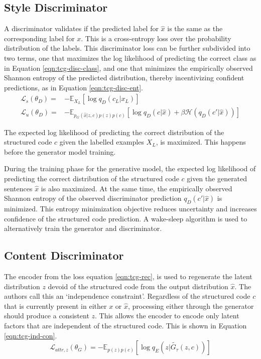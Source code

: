 \subsection{Style Discriminator}

A discriminator validates if the predicted label for $\hat{x}$ is the same as the corresponding label for $x$. This is a cross-entropy loss over the probability distribution of the labels. This discriminator loss can be further subdivided into two terms, one that maximizes the log likelihood of predicting the correct class as in Equation \ref{eqn:tcg-disc-class}, and one that minimizes the empirically observed Shannon entropy of the predicted distribution, thereby incentivizing confident predictions, as in Equation \ref{eqn:tcg-disc-ent}.
\begin{align}
	\label{eqn:tcg-disc-class}
	\mathcal{L}_s(\theta_D) = & - \mathbb{E}_{X_L}[\log q_D(c_L|x_L)]   \\
	\label{eqn:tcg-disc-ent}
	\mathcal{L}_u(\theta_D) = & - \mathbb{E}_{p_G(\hat{x}|z,c)p(z)p(c)}
	[\log q_D(c|\hat{x}) + \beta \mathcal{H}(q_D(c'|\hat{x}))]
\end{align}

The expected log likelihood of predicting the correct distribution of the structured code $c$ given the labelled examples $X_L$, is maximized. This happens before the generator model training.

During the training phase for the generative model, the expected log likelihood of predicting the correct distribution of the structured code $c$ given the generated sentences $\hat{x}$ is also maximized. At the same time, the empirically observed Shannon entropy of the observed discriminator prediction $q_D(c'|\hat{x})$ is minimized. This entropy minimization objective reduces uncertainty and increases confidence of the structured code prediction. A wake-sleep algorithm \citep{hinton1995wake} is used to alternatively train the generator and discriminator.

\subsection{Content Discriminator}

The encoder from the loss equation \ref{eqn:tcg-rec}, is used to regenerate the latent distribution $z$ devoid of the structured code from the output distribution $\hat{x}$. The authors call this an `independence constraint'. Regardless of the structured code $c$ that is currently present in either $x$ or $\hat{x}$, processing either through the generator should produce a consistent $z$. This allows the encoder to encode only latent factors that are independent of the structured code. This is shown in Equation \ref{eqn:tcg-ind-con}.
\begin{equation} \label{eqn:tcg-ind-con}
	\mathcal{L}_{attr, z}(\theta_G) = - \mathbb{E}_{p(z)p(c)}
	[\log q_E(z|\tilde{G_{\tau}}(z,c))]
\end{equation}

